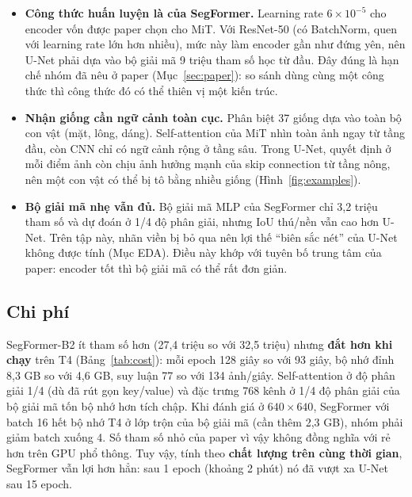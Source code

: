 \documentclass[12pt]{article}
\newcommand{\st}[1]{\textbf{#1}}
\begin{document}
\begin{itemize}
  \item \st{Công thức huấn luyện là của SegFormer.} Learning rate $6\times10^{-5}$ cho encoder vốn được paper chọn cho MiT.
        Với ResNet-50 (có BatchNorm, quen với learning rate lớn hơn nhiều), mức này làm encoder gần như đứng yên, nên
        U-Net phải dựa vào bộ giải mã 9 triệu tham số học từ đầu. Đây đúng là hạn chế nhóm đã nêu ở paper
        (Mục~\ref{sec:paper}): so sánh dùng cùng một công thức thì công thức đó có thể thiên vị một kiến trúc.
  \item \st{Nhận giống cần ngữ cảnh toàn cục.} Phân biệt 37 giống dựa vào toàn bộ con vật (mặt, lông, dáng). Self-attention
        của MiT nhìn toàn ảnh ngay từ tầng đầu, còn CNN chỉ có ngữ cảnh rộng ở tầng sâu. Trong U-Net, quyết định ở mỗi điểm
        ảnh còn chịu ảnh hưởng mạnh của skip connection từ tầng nông, nên một con vật có thể bị tô bằng nhiều giống
        (Hình~\ref{fig:examples}).
  \item \st{Bộ giải mã nhẹ vẫn đủ.} Bộ giải mã MLP của SegFormer chỉ 3,2 triệu tham số và dự đoán ở 1/4 độ phân giải, nhưng
        IoU thú/nền vẫn cao hơn U-Net. Trên tập này, nhãn viền bị bỏ qua nên lợi thế ``biên sắc nét'' của U-Net không được
        tính (Mục EDA). Điều này khớp với tuyên bố trung tâm của paper: encoder tốt thì bộ giải mã có thể rất đơn giản.
\end{itemize}

\subsection{Chi phí}
SegFormer-B2 ít tham số hơn (27,4 triệu so với 32,5 triệu) nhưng \st{đắt hơn khi chạy} trên T4 (Bảng~\ref{tab:cost}): mỗi
epoch 128 giây so với 93 giây, bộ nhớ đỉnh 8,3 GB so với 4,6 GB, suy luận 77 so với 134 ảnh/giây. Self-attention ở độ phân
giải 1/4 (dù đã rút gọn key/value) và đặc trưng 768 kênh ở 1/4 độ phân giải của bộ giải mã tốn bộ nhớ hơn tích chập.
Khi đánh giá ở $640\times640$, SegFormer với batch 16 hết bộ nhớ T4 ở lớp trộn của bộ giải mã (cần thêm 2,3 GB), nhóm phải giảm
batch xuống 4. Số tham số nhỏ của paper vì vậy không đồng nghĩa với rẻ hơn trên GPU phổ thông. Tuy vậy, tính theo
\st{chất lượng trên cùng thời gian}, SegFormer vẫn lợi hơn hẳn: sau 1 epoch (khoảng 2 phút) nó đã vượt xa U-Net sau 15 epoch.
\end{document}
